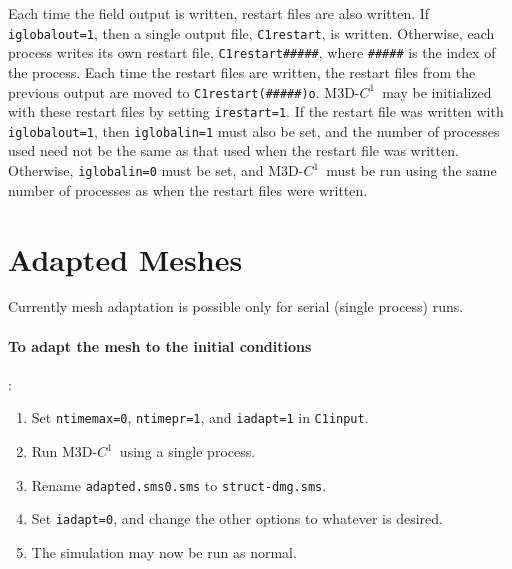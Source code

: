 \documentclass[letterpaper]{book}
\newcommand{\codename}{M3D-$C^1$}
\begin{document}
Each time the field output is written, restart files are also written.
If \texttt{iglobalout=1}, then a single output file,
\texttt{C1restart}, is written.  Otherwise, each process writes its
own restart file, \texttt{C1restart\#\#\#\#\#}, where
\texttt{\#\#\#\#\#} is the index of the process.  Each time the
restart files are written, the restart files from the previous output
are moved to \texttt{C1restart(\#\#\#\#\#)o}.  \codename\ may be
initialized with these restart files by setting \texttt{irestart=1}.
If the restart file was written with \texttt{iglobalout=1}, then
\texttt{iglobalin=1} must also be set, and the number of processes
used need not be the same as that used when the restart file was
written.  Otherwise, \texttt{iglobalin=0} must be set, and
\codename\ must be run using the same number of processes as when the
restart files were written.


\section{Adapted Meshes}

Currently mesh adaptation is possible only for serial (single process)
runs.  

\paragraph{To adapt the mesh to the initial conditions}:
\begin{enumerate}
\item Set \texttt{ntimemax=0}, \texttt{ntimepr=1}, and
  \texttt{iadapt=1} in \texttt{C1input}.
\item Run \codename\ using a single process.  
\item Rename \texttt{adapted.sms0.sms} to \texttt{struct-dmg.sms}.
\item Set \texttt{iadapt=0}, and change the other options to whatever
  is desired.  
\item The simulation may now be run as normal.
\end{enumerate}
\end{document}

